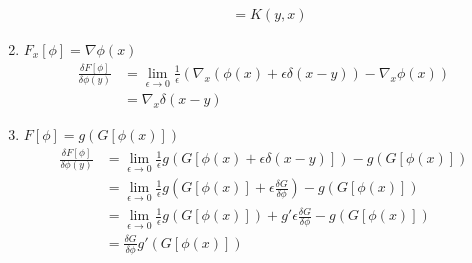 \documentclass[10pt,a4paper]{article}
\theoremstyle{definition}
\begin{document}
\begin{enumerate}
\begin{align}
           &=K(y,x)
    \end{align}
    \item $F_x[\phi]=\nabla\phi(x)$
    \begin{align}
        \frac{\delta F[\phi]}{\delta\phi(y)}
        &=\lim_{\epsilon\rightarrow0}\frac{1}{\epsilon}\left( \nabla_x(\phi(x)+\epsilon\delta(x-y)) - \nabla_x\phi(x)\right)\\
        &=\nabla_x\delta(x-y)
    \end{align}
    \item $F[\phi]=g\left(G[\phi(x)]\right)$
    \begin{align}
        \frac{\delta F[\phi]}{\delta\phi(y)}
        &=\lim_{\epsilon\rightarrow0}\frac{1}{\epsilon}g(G[\phi(x)+\epsilon\delta(x-y)])-g(G[\phi(x)])\\
        &=\lim_{\epsilon\rightarrow0}\frac{1}{\epsilon}g(G[\phi(x)]+\epsilon\frac{\delta G}{\delta \phi})-g(G[\phi(x)])\\
        &=\lim_{\epsilon\rightarrow0}\frac{1}{\epsilon}g(G[\phi(x)])+g' \epsilon\frac{\delta G}{\delta \phi}-g(G[\phi(x)])\\
        &=\frac{\delta G}{\delta \phi}g'(G[\phi(x)])
    \end{align}
    
\end{enumerate}
\end{document}
